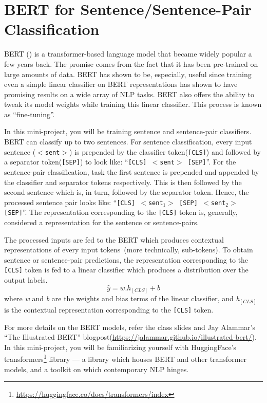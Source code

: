 \section{BERT for Sentence/Sentence-Pair Classification}
\label{sec: expl}
BERT (\cite{devlin-etal-2019-bert}) is a transformer-based language model that became widely popular a few years back. The promise comes from the fact that it has been pre-trained on large amounts of data. BERT has shown to be, especially, useful since training even a simple linear classifier on BERT representations has shown to have promising results on a wide array of NLP tasks. BERT also offers the ability to tweak its model weights while training this linear classifier. This process is known as ``fine-tuning''. 

In this mini-project, you will be training sentence and sentence-pair classifiers. BERT can classify up to two sentences. For sentence classification, every input sentence (\texttt{$<$sent$>$}) is prepended by the classifier  token(\texttt{[CLS]}) and followed by a separator token(\texttt{[SEP]}) to look like: ``\texttt{[CLS] $<$sent$>$ [SEP]}''. For the sentence-pair classification, task the first sentence is prepended and appended by the classifier and separator tokens respectively. This is then followed by the second sentence which is, in turn, followed by the separator token. Hence, the processed sentence pair looks like: ``\texttt{[CLS] $<$sent$_1>$ [SEP] $<$sent$_2>$ [SEP]}''. The representation corresponding to the \texttt{[CLS]} token is, generally, considered a representation for the sentence or sentence-pairs.

The processed inputs are fed to the BERT which produces contextual representations of every input tokens~(more technically, sub-tokens). To obtain sentence or sentence-pair predictions, the representation corresponding to the \texttt{[CLS]} token is fed to a linear classifier which produces a distribution over the output labels.
\begin{equation*}
    \hat{y} = w.h_{[CLS]} + b
\end{equation*}
where \emph{w} and \emph{b} are the weights and bias terms of the linear classifier, and \emph{h$_{[CLS]}$} is the contextual representation corresponding to the \texttt{[CLS]} token.

For more details on the BERT models, refer the class slides and Jay Alammar's ``The Illustrated BERT'' blogpost(\url{https://jalammar.github.io/illustrated-bert/}). In this mini-project, you will be familiarizing yourself with HuggingFace's transformers\footnote{\url{https://huggingface.co/docs/transformers/index}} library --- a library which houses BERT and other transformer models, and a toolkit on which contemporary NLP hinges.